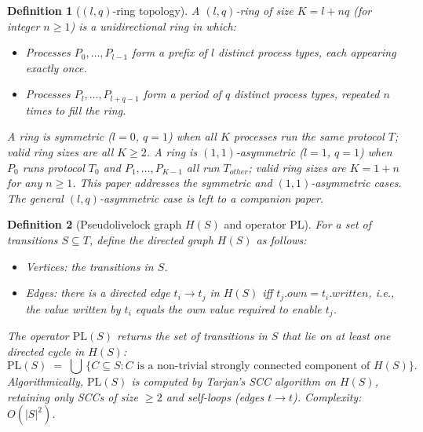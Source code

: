 \documentclass{article}
\newtheorem{definition}{Definition}
\newcommand{\PL}{\mathrm{PL}}
\newcommand{\own}{\mathit{own}}
\newcommand{\writ}{\mathit{written}}
\begin{document}
\begin{definition}[$(l,q)$-ring topology]
\label{def:lq}
A \emph{$(l,q)$-ring} of size $K = l + nq$ (for integer $n\geq 1$)
is a unidirectional ring in which:
\begin{itemize}
  \item Processes $P_0,\ldots,P_{l-1}$ form a \emph{prefix} of $l$
        distinct process types, each appearing exactly once.
  \item Processes $P_l,\ldots,P_{l+q-1}$ form a \emph{period} of $q$
        distinct process types, repeated $n$ times to fill the ring.
\end{itemize}
A ring is \emph{symmetric} ($l=0$, $q=1$) when all $K$ processes run
the same protocol $T$; valid ring sizes are all $K\geq 2$.
A ring is \emph{$(1,1)$-asymmetric} ($l=1$, $q=1$) when $P_0$ runs
protocol $T_0$ and $P_1,\ldots,P_{K-1}$ all run $T_{\mathit{other}}$;
valid ring sizes are $K = 1+n$ for any $n\geq 1$.
This paper addresses the symmetric and $(1,1)$-asymmetric cases.
The general $(l,q)$-asymmetric case is left to a companion paper.
\end{definition}

\begin{definition}[Pseudolivelock graph $H(S)$ and operator $\PL$]
\label{def:H}
For a set of transitions $S\subseteq T$, define the directed graph
$H(S)$ as follows:
\begin{itemize}
  \item \emph{Vertices}: the transitions in $S$.
  \item \emph{Edges}: there is a directed edge $t_i\!\to\!t_j$ in
        $H(S)$ iff $t_j.\own = t_i.\writ$, i.e., the value written by
        $t_i$ equals the own value required to enable $t_j$.
\end{itemize}
The operator $\PL(S)$ returns the set of transitions in $S$ that lie on
at least one directed cycle in $H(S)$:
\[
  \PL(S) \;=\; \bigcup\, \{C \subseteq S : C \text{ is a non-trivial
  strongly connected component of } H(S)\}.
\]
Algorithmically, $\PL(S)$ is computed by Tarjan's SCC algorithm on
$H(S)$, retaining only SCCs of size $\geq 2$ and self-loops (edges
$t\to t$). Complexity: $O(|S|^2)$.
\end{definition}
\end{document}
